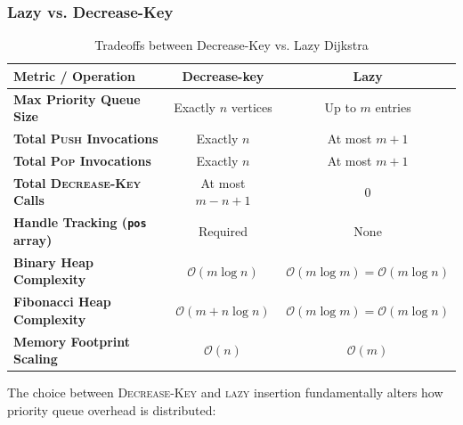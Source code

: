 \subsubsection{Lazy vs. Decrease-Key}
\begin{table}[H]
  \centering
  \small
  \caption{Tradeoffs between Decrease-Key vs. Lazy Dijkstra}
  \label{tab:eager_vs_lazy}
  \begin{tabular}{lcc}
    \toprule
    \textbf{Metric / Operation} & \textbf{Decrease-key} & \textbf{Lazy} \\
    \midrule
    \textbf{Max Priority Queue Size} & Exactly $n$ vertices & Up to $m$ entries\\
    \textbf{Total \textsc{Push} Invocations} & Exactly $n$ & At most $m + 1$ \\
    \textbf{Total \textsc{Pop} Invocations} & Exactly $n$ & At most $m + 1$ \\
    \textbf{Total \textsc{Decrease-Key} Calls} & At most $m - n + 1$ & 0 \\
    \textbf{Handle Tracking (\texttt{pos} array)} & Required & None \\
    \textbf{Binary Heap Complexity} & $\mathcal{O}(m \log n)$ & $\mathcal{O}(m \log m) = \mathcal{O}(m \log n)$ \\
    \textbf{Fibonacci Heap Complexity} & $\mathcal{O}(m + n \log n)$ & $\mathcal{O}(m \log m) = \mathcal{O}(m \log n)$ \\
    \textbf{Memory Footprint Scaling} & $\mathcal{O}(n)$ & $\mathcal{O}(m)$ \\
    \bottomrule
  \end{tabular}
\end{table}

The choice between \textsc{Decrease-Key} and \textsc{lazy} insertion fundamentally alters how priority queue overhead is distributed:


